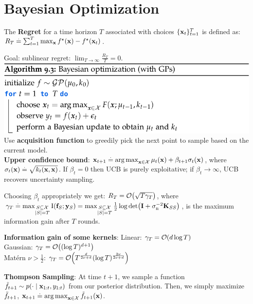 \section{Bayesian Optimization}
\begin{framed}
    The \textbf{Regret} for a time horizon $T$ associated with choices $\{\mathbf{x}_t\}_{t=1}^T$ is defined as: $R_T \overset{.}{=} \sum_{t=1}^T {\max_{\mathbf{x}} f^\star(\mathbf{x}) - f^\star(\mathbf{x}_t)}$.
\end{framed}
Goal: sublinear regret: $\lim_{T\to\infty} \frac{R_T}{T} = 0$.
\includegraphics[width=0.98\linewidth,trim={0 0 3cm 0}]{images/Bayesian_Optimization.png}
Use \textbf{acquisition function} to greedily pick the next point to sample based on the current model. \\
\textbf{Upper confidence bound}: $\mathbf{x}_{t+1} \overset{.}{=} \operatorname*{arg\,max}_{\mathbf{x} \in \mathcal{X}} \mu_{t}(\mathbf{x}) + \beta_{t+1} \sigma_{t}(\mathbf{x})$, where $\sigma_t(\mathbf{x}) \overset{.}{=} \sqrt{k_t(\mathbf{x}, \mathbf{x})}$. If $\beta_t = 0$ then UCB is purely exploitative; if $\beta_t \to \infty$, UCB recovers uncertainty sampling.
\begin{framed}
    Choosing $\beta_t$ appropriately we get: $R_T = \BigO{\sqrt{T \gamma_T}}$, where $\gamma_T \defeq \max_{\substack{\sS \subseteq \spX \\ \card{\sS} = T}} \I{\vf_\sS}{\vy_\sS} = \max_{\substack{\sS \subseteq \spX \\ |\sS| = T}} \frac{1}{2} \log\det{\mI + \sigman^{-2} \mK_{\sS\sS}}$, is the maximum information gain after $T$ rounds.
\end{framed}
\begin{framed}
    \textbf{Information gain of some kernels}:
    Linear: $\gamma_T = \BigO{d \log T}$ \\
    Gaussian: $\gamma_T = \BigO{(\log T)^{d+1}}$ \\
    Matérn $\nu > \frac{1}{2}$: $\gamma_T = \BigO{T^{\frac{d}{2\nu + d}} (\log T)^{\frac{2\nu}{2\nu + d}}}$
\end{framed}
\textbf{Thompson Sampling}: At time $t+1$, we sample a function $\Tilde{f}_{t+1} \sim p(\cdot \mid \mathbf{x}_{1:t}, y_{1:t})$ from our posterior distribution.
Then, we simply maximize $\Tilde{f}_{t+1}$, $\mathbf{x}_{t+1} \overset{.}{=} \operatorname*{arg\,max}_{\mathbf{x} \in \mathcal{X}} \Tilde{f}_{t+1}(\mathbf{x})$.
